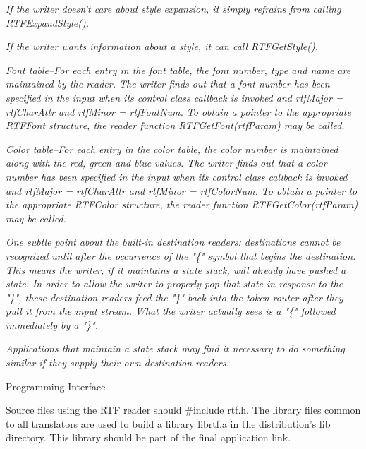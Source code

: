 \documentclass{article}
\begin{document}
{{{{{{{{{{\noindent
{\bf {\em If the writer doesn't care about style expansion, it simply refrains 
from calling RTFExpandStyle().



\noindent
{\bf {\em If the writer wants information about a style, it can call RTFGetStyle().



\noindent
{\bf {\em Font table--For each entry in the font table, the font number, type 
and name are maintained by the reader. The writer finds out that a font number 
has been specified in the input when its control class callback is invoked 
and rtfMajor = rtfCharAttr and rtfMinor = rtfFontNum. To obtain a pointer 
to the appropriate RTFFont structure, the reader function RTFGetFont(rtfParam) 
may be called.



\noindent
{\bf {\em Color table--For each entry in the color table, the color number 
is maintained along with the red, green and blue values. The writer finds 
out that a color number has been specified in the input when its control 
class callback is invoked and rtfMajor = rtfCharAttr and rtfMinor = rtfColorNum. 
To obtain a pointer to the appropriate RTFColor structure, the reader function 
RTFGetColor(rtfParam) may be called.



\noindent
{\bf {\em One subtle point about the built-in destination readers: destinations 
cannot be recognized until after the occurrence of the "\{" symbol that begins 
the destination. This means the writer, if it maintains a state stack, will 
already have pushed a state. In order to allow the writer to properly pop 
that state in response to the "\}", these destination readers feed the "\}" 
back into the token router after they pull it from the input stream. What 
the writer actually sees is a "\{" followed immediately by a "\}".



\noindent
{\bf {\em Applications that maintain a state stack may find it necessary 
to do something similar if they supply their own destination readers.



}}}}}}}}}}}}}}}}}}}}}}
\noindent
Programming Interface






\noindent
Source files using the RTF reader should \#include rtf.h. The library files 
common to all translators are used to build a library librtf.a in the distribution's 
lib directory. This library should be part of the final application link.
\end{document}

